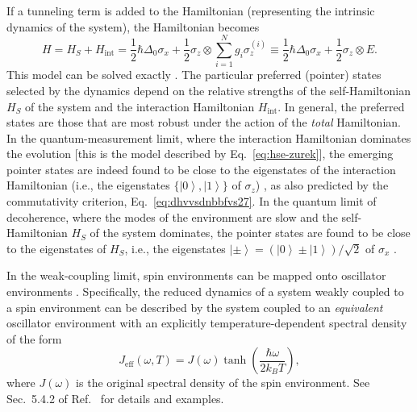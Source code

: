\documentclass[3p,sort&compress,12pt]{elsarticle}
\newcommand{\ket}[1]{\left\vert{#1}\right\rangle}
\newcommand{\op}[1]{#1}
\begin{document}
If a tunneling term is added to the Hamiltonian (representing the intrinsic dynamics of the system), the Hamiltonian becomes
%
\begin{equation}\label{eq:jhdsgwuygfurwb}
  H = \op{H}_S + \op{H}_\text{int} =  \frac{1}{2}\hbar
  \Delta_0 \sigma_x + \frac{1}{2} \sigma_z \otimes
  \sum_{i=1}^N g_i
  \sigma_z^{(i)} 
  \equiv \frac{1}{2}\hbar \Delta_0 \sigma_x + \frac{1}{2}
  \sigma_z \otimes E.
\end{equation}
%
This model can be solved exactly \cite{Dobrovitski:2003:az,Cucchietti:2005:om}. The particular preferred (pointer) states selected by the dynamics depend on the relative strengths of the self-Hamiltonian $\op{H}_S$ of the system and the interaction Hamiltonian $\op{H}_\text{int}$. In general, the preferred states are those that are most robust under the action of the \emph{total} Hamiltonian. In the quantum-measurement limit, where the interaction Hamiltonian dominates the evolution [this is the model described by Eq.~\eqref{eq:hse-zurek}], the emerging pointer states are indeed found to be close to the eigenstates of the interaction Hamiltonian (i.e., the eigenstates $\{\ket{0},\ket{1}\}$ of $\op{\sigma}_z$) \cite{Cucchietti:2005:om}, as also predicted by the commutativity criterion, Eq.~\eqref{eq:dhvvsdnbbfvs27}. In the quantum limit of decoherence, where the modes of the environment are slow and the self-Hamiltonian $\op{H}_S$ of the system dominates, the pointer states are found to be close to the eigenstates of $\op{H}_S$, i.e., the eigenstates $\ket{\pm}=\left(\ket{0}\pm\ket{1}\right)/\sqrt{2}$ of  $\op{\sigma}_x$ \cite{Cucchietti:2005:om}.

In the weak-coupling limit, spin environments can be mapped onto oscillator environments \cite{Feynman:1963:jj,Caldeira:1993:bz}. Specifically, the reduced dynamics of a system weakly coupled to a spin environment can be described by the system coupled to an \emph{equivalent} oscillator environment with an explicitly temperature-dependent spectral density of the form
%
\begin{equation}
\label{eq:vslkfvfgyiJA2}
J_\text{eff}(\omega, T) = J(\omega)
\tanh\left(\frac{\hbar\omega}{2k_B T}\right),
\end{equation}
%
where $J(\omega)$ is the original spectral density of the spin environment. See Sec.~5.4.2 of Ref.~\cite{Schlosshauer:2007:un} for details and examples.
\end{document}
